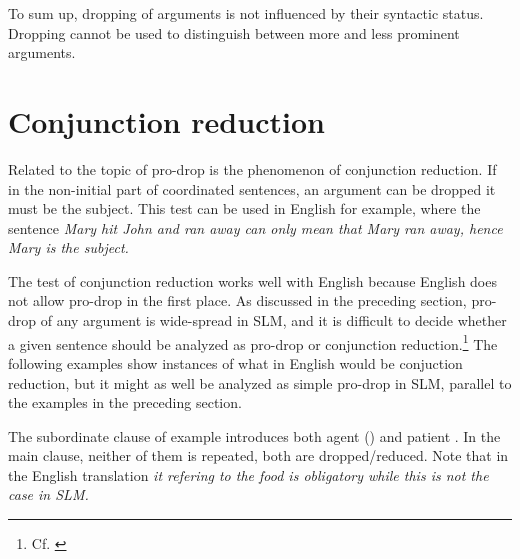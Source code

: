 
To sum up, dropping of arguments is not influenced by their syntactic status. Dropping cannot be used to distinguish between more and less prominent arguments.

\section{Conjunction reduction}\label{sec:grel:Conjunctionreduction}
Related to the topic of pro-drop is the phenomenon of conjunction reduction. If in the non-initial part of coordinated sentences, an argument can be dropped it must be the subject. This test can be used in English for example, where the sentence \em Mary hit John and \zero{} ran away \em can only mean that Mary ran away, hence \em Mary \em is the subject. 

The test of conjunction reduction works well with English because English does not allow pro-drop in the first place. As discussed in the preceding section, pro-drop of any argument is wide-spread in SLM, and it is difficult to decide whether a given sentence should be analyzed as pro-drop or conjunction reduction.\footnote{Cf. \citet[171]{Himmelmann2005typochar}}
The following examples show instances of what in English would be conjuction reduction, but it might as well be analyzed as simple pro-drop in SLM, parallel to the examples in the preceding section.

The subordinate clause of example  introduces both agent () and patient . In the main clause, neither of them is repeated, both are dropped/reduced. Note that in the English translation \em it \em refering to the food is obligatory while this is not the case in SLM.



